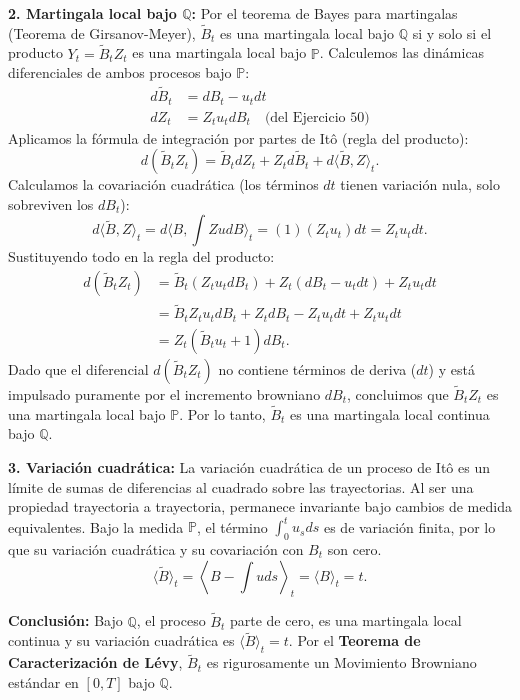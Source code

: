 \documentclass[11pt, letterpaper]{article}
\begin{document}
\begin{solucion}
    \textbf{2. Martingala local bajo $\mathbb{Q}$:}
    Por el teorema de Bayes para martingalas (Teorema de Girsanov-Meyer), $\tilde{B}_t$ es una martingala local bajo $\mathbb{Q}$ si y solo si el producto $Y_t = \tilde{B}_t Z_t$ es una martingala local bajo $\mathbb{P}$.
    Calculemos las dinámicas diferenciales de ambos procesos bajo $\mathbb{P}$:
    \begin{align*}
        d\tilde{B}_t &= dB_t - u_t dt \\
        dZ_t &= Z_t u_t dB_t \quad \text{(del Ejercicio 50)}
    \end{align*}
    Aplicamos la fórmula de integración por partes de Itô (regla del producto):
    \[ d(\tilde{B}_t Z_t) = \tilde{B}_t dZ_t + Z_t d\tilde{B}_t + d\langle \tilde{B}, Z \rangle_t. \]
    Calculamos la covariación cuadrática (los términos $dt$ tienen variación nula, solo sobreviven los $dB_t$):
    \[ d\langle \tilde{B}, Z \rangle_t = d\langle B, \int Z u dB \rangle_t = (1)(Z_t u_t) dt = Z_t u_t dt. \]
    Sustituyendo todo en la regla del producto:
    \begin{align*}
        d(\tilde{B}_t Z_t) &= \tilde{B}_t (Z_t u_t dB_t) + Z_t (dB_t - u_t dt) + Z_t u_t dt \\
        &= \tilde{B}_t Z_t u_t dB_t + Z_t dB_t - Z_t u_t dt + Z_t u_t dt \\
        &= Z_t (\tilde{B}_t u_t + 1) dB_t.
    \end{align*}
    Dado que el diferencial $d(\tilde{B}_t Z_t)$ no contiene términos de deriva ($dt$) y está impulsado puramente por el incremento browniano $dB_t$, concluimos que $\tilde{B}_t Z_t$ es una martingala local bajo $\mathbb{P}$. Por lo tanto, $\tilde{B}_t$ es una martingala local continua bajo $\mathbb{Q}$.

    \textbf{3. Variación cuadrática:}
    La variación cuadrática de un proceso de Itô es un límite de sumas de diferencias al cuadrado sobre las trayectorias. Al ser una propiedad trayectoria a trayectoria, permanece invariante bajo cambios de medida equivalentes.
    Bajo la medida $\mathbb{P}$, el término $\int_0^t u_s ds$ es de variación finita, por lo que su variación cuadrática y su covariación con $B_t$ son cero.
    \[ \langle \tilde{B} \rangle_t = \left\langle B - \int u ds \right\rangle_t = \langle B \rangle_t = t. \]
    
    \textbf{Conclusión:}
    Bajo $\mathbb{Q}$, el proceso $\tilde{B}_t$ parte de cero, es una martingala local continua y su variación cuadrática es $\langle \tilde{B} \rangle_t = t$. Por el \textbf{Teorema de Caracterización de Lévy}, $\tilde{B}_t$ es rigurosamente un Movimiento Browniano estándar en $[0, T]$ bajo $\mathbb{Q}$.


\end{solucion}
\end{document}

